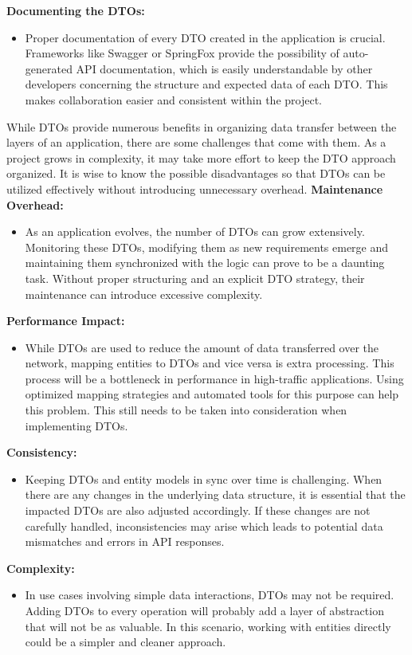     \textbf{Documenting the DTOs:}
        \begin{itemize}
            \item Proper documentation of every DTO created in the application is crucial. Frameworks like Swagger or SpringFox provide the possibility of auto-generated API documentation, which is easily understandable by other developers concerning the structure and expected data of each DTO. This makes collaboration easier and consistent within the project. 
        \end{itemize} 
    While DTOs provide numerous benefits in organizing data transfer between the layers of an application, there are some challenges that come with them. As a project grows in complexity, it may take more effort to keep the DTO approach organized. It is wise to know the possible disadvantages so that DTOs can be utilized effectively without introducing unnecessary overhead. \newline \newline
    \textbf{Maintenance Overhead:}
    \begin{itemize}
        \item As an application evolves, the number of DTOs can grow extensively. Monitoring these DTOs, modifying them as new requirements emerge and maintaining them synchronized with the logic can prove to be a daunting task. Without proper structuring and an explicit DTO strategy, their maintenance can introduce excessive complexity.
    \end{itemize}
    \textbf{Performance Impact:}
    \begin{itemize}
        \item While DTOs are used to reduce the amount of data transferred over the network, mapping entities to DTOs and vice versa is extra processing. This process will be a bottleneck in performance in high-traffic applications. Using optimized mapping strategies and automated tools for this purpose can help this problem. This still needs to be taken into consideration when implementing DTOs.
    \end{itemize}
    \textbf{Consistency:}
    \begin{itemize}
        \item Keeping DTOs and entity models in sync over time is challenging. When there are any changes in the underlying data structure, it is essential that the impacted DTOs are also adjusted accordingly. If these changes are not carefully handled, inconsistencies may arise which leads to potential data mismatches and errors in API responses.
    \end{itemize}
    \textbf{Complexity:}
    \begin{itemize}
        \item In use cases involving simple data interactions, DTOs may not be required. Adding DTOs to every operation will probably add a layer of abstraction that will not be as valuable. In this scenario, working with entities directly could be a simpler and cleaner approach.
    \end{itemize} \Autocite{Andi:DTOs}
    
